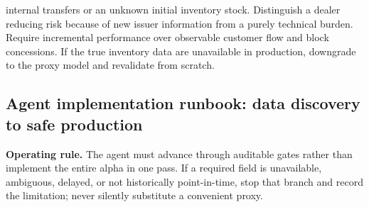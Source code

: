 \documentclass[10pt]{article}
\begin{document}
internal transfers or an unknown initial inventory stock. Distinguish a dealer reducing risk because of new issuer information from a purely technical burden. Require incremental performance over observable customer flow and block concessions. If the true inventory data are unavailable in production, downgrade to the proxy model and revalidate from scratch.
\subsection{Agent implementation runbook: data discovery to safe production}
\textbf{Operating rule.} The agent must advance through auditable gates rather than implement the entire alpha in one pass. If a required field is unavailable, ambiguous, delayed, or not historically point-in-time, stop that branch and record the limitation; never silently substitute a convenient proxy.
\end{document}
